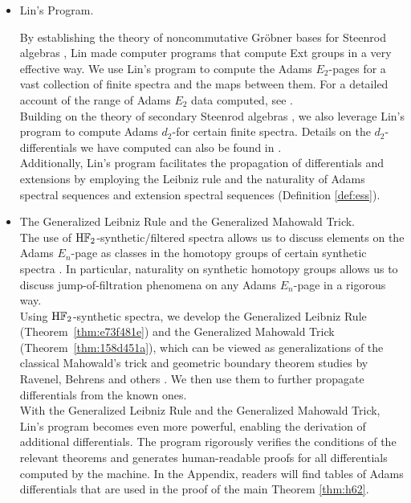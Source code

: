 \documentclass{amsart}
\numberwithin{equation}{section}
\newcommand{\HF}{\mathrm{H}\bF_2}
\begin{document}
\begin{itemize}
    \item Lin's Program.

    \noindent By establishing the theory of noncommutative Gr\"obner bases for Steenrod algebras \cite{LinGrobner}, Lin made computer programs that compute Ext groups in a very effective way. We use Lin's program to compute the Adams $E_2$-pages for a vast collection of finite spectra and the maps between them. For a detailed account of the range of Adams $E_2$ data computed, see \cite{LWXMachine}.\\
    
    \noindent Building on the theory of secondary Steenrod algebras \cite{BJ, Nassau, Chua}, we also leverage Lin’s program to compute Adams $d_2$-for certain finite spectra. Details on the $d_2$-differentials we have computed can also be found in \cite{LWXMachine}.\\
    
    \noindent Additionally, Lin’s program facilitates the propagation of differentials and extensions by employing the Leibniz rule and the naturality of Adams spectral sequences and extension spectral sequences (Definition \ref{def:ess}). \\

    \item The Generalized Leibniz Rule and the Generalized Mahowald Trick. \\

    \noindent The use of $\HF$-synthetic/filtered spectra allows us to discuss elements on the Adams $E_n$-page as classes in the homotopy groups of certain synthetic spectra \cite{Pst, BurklundXu}. In particular, naturality on synthetic homotopy groups allows us to discuss jump-of-filtration phenomena on any Adams $E_n$-page in a rigorous way. \\
    
    \noindent Using $\HF$-synthetic spectra, we develop the Generalized Leibniz Rule (Theorem~\ref{thm:e73f481e}) and the Generalized Mahowald Trick (Theorem~\ref{thm:158d451a}), which can be viewed as generalizations of the classical Mahowald's trick and geometric boundary theorem studies by Ravenel, Behrens and others \cite{RavenelGreenbook, Behrens, Ma, BurklundCookware}. We then use them to further propagate differentials from the known ones.\\

    \noindent With the Generalized Leibniz Rule and the Generalized Mahowald Trick, Lin’s program becomes even more powerful, enabling the derivation of additional differentials. The program rigorously verifies the conditions of the relevant theorems and generates human-readable proofs \cite{LWXZenodo} for all differentials computed by the machine. In the Appendix, readers will find tables of Adams differentials that are used in the proof of the main Theorem \ref{thm:h62}.\\


\end{itemize}
\end{document}
